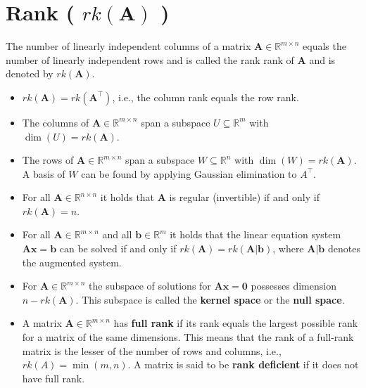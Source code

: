 \section{Rank ( $rk(\mathbf{A})$ ) \cite{mfml-1}}\label{matrix: Rank}

The number of linearly independent columns of a matrix $\mathbf{A} \in \mathbb{R}^{m \times n}$ equals the number of linearly independent rows and is called the rank rank of $\mathbf{A}$ and is denoted by $rk(\mathbf{A})$.

\begin{itemize}
    \item $rk(\mathbf{A}) = rk(\mathbf{A}^\top)$, i.e., the column rank equals the row rank.

    \item The columns of $\mathbf{A} \in \mathbb{R}^{m \times n}$ span a subspace $U \subseteq \mathbb{R}^m$ with $\dim(U) = rk(\mathbf{A})$. 

    \item The rows of $\mathbf{A} \in \mathbb{R}^{m\times n}$ span a subspace $W \subseteq \mathbb{R}^n$ with $\dim(W) = rk(\mathbf{A})$. A basis of $W$ can be found by applying Gaussian elimination to $A^\top$.

    \item For all $\mathbf{A} \in \mathbb{R}^{n\times n}$ it holds that $\mathbf{A}$ is regular (invertible) if and only if $rk(\mathbf{A}) = n$.

    \item For all $\mathbf{A} \in \mathbb{R}^{m\times n}$ and all $\mathbf{b} \in \mathbb{R}^m$ it holds that the linear equation system $\mathbf{Ax = b}$ can be solved if and only if $rk(\mathbf{A}) = rk(\mathbf{A}|\mathbf{b})$, where $\mathbf{A}|\mathbf{b}$ denotes the augmented system.

    \item For $\mathbf{A} \in \mathbb{R}^{m\times n}$ the subspace of solutions for $\mathbf{Ax = 0}$ possesses dimension $n - rk(\mathbf{A})$. This subspace is called the \textbf{kernel space} or the \textbf{null space}.

    \item A matrix $\mathbf{A} \in \mathbb{R}^{m\times n}$ has \textbf{full rank} if its rank equals the largest possible rank for a matrix of the same dimensions. This means that the rank of a full-rank matrix is the lesser of the number of rows and columns, i.e., $rk(A) = \min(m, n)$. A matrix is said to be \textbf{rank deficient} if it does not have full rank.

\end{itemize}


